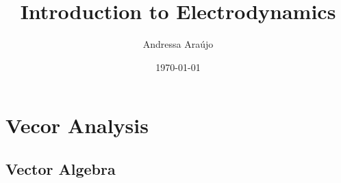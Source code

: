 \documentclass[a4paper,12pt]{book}
\title{Introduction to Electrodynamics}
\author{Andressa Araújo}
\date{\today}
\begin{document}
	\maketitle
	
	\tableofcontents %
	
	\chapter{Vecor Analysis}
	
	\section{Vector Algebra}

	
	
	
	
\end{document}
